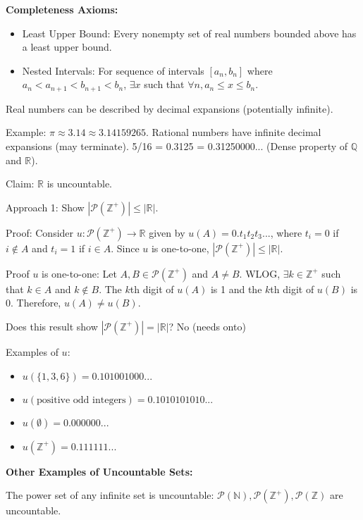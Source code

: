 \documentclass{article}
\begin{document}
\begin{multicols}{3}
\noindent
\textbf{Completeness Axioms:}
\begin{itemize}[noitemsep,nolistsep,leftmargin=*,label=$\bullet$]
    \item Least Upper Bound: Every nonempty set of real numbers bounded above has a least upper bound.
    \item Nested Intervals: For sequence of intervals $[a_n, b_n]$ where $a_n < a_{n+1} < b_{n+1} < b_n$, $\exists x$ such that $\forall n, a_n \le x \le b_n$.
\end{itemize}

\noindent
Real numbers can be described by decimal expansions (potentially infinite).

\noindent
Example: $\pi \approx 3.14 \approx 3.14159265$. Rational numbers have infinite decimal expansions (may terminate). 5/16 = 0.3125 = 0.31250000...  (Dense property of $\mathbb{Q}$ and $\mathbb{R}$).

\noindent
Claim: $\mathbb{R}$ is uncountable.

\noindent
Approach 1: Show $|\mathcal{P}(\mathbb{Z}^+)| \le |\mathbb{R}|$.

\noindent
Proof: Consider $u: \mathcal{P}(\mathbb{Z}^+) \to \mathbb{R}$ given by $u(A) = 0.t_1 t_2 t_3 ...$, where $t_i = 0$ if $i \notin A$ and $t_i = 1$ if $i \in A$. Since $u$ is one-to-one, $|\mathcal{P}(\mathbb{Z}^+)| \le |\mathbb{R}|$.

\noindent
Proof $u$ is one-to-one: Let $A, B \in \mathcal{P}(\mathbb{Z}^+)$ and $A \neq B$.  WLOG, $\exists k \in \mathbb{Z}^+$ such that $k \in A$ and $k \notin B$.  The $k$th digit of $u(A)$ is 1 and the $k$th digit of $u(B)$ is 0.  Therefore, $u(A) \neq u(B)$.

\noindent
Does this result show $|\mathcal{P}(\mathbb{Z}^+)| = |\mathbb{R}|$? No (needs onto)

\noindent
Examples of $u$:
\begin{itemize}[noitemsep,nolistsep,leftmargin=*,label=$\bullet$]
    \item $u(\{1, 3, 6\}) = 0.101001000...$
    \item $u(\text{positive odd integers}) = 0.1010101010...$
    \item $u(\emptyset) = 0.000000...$
    \item $u(\mathbb{Z}^+) = 0.111111...$
\end{itemize}

\noindent
\textbf{Other Examples of Uncountable Sets:}

\noindent
The power set of any infinite set is uncountable: $\mathcal{P}(\mathbb{N}), \mathcal{P}(\mathbb{Z}^+), \mathcal{P}(\mathbb{Z})$ are uncountable.


\end{multicols}
\end{document}
